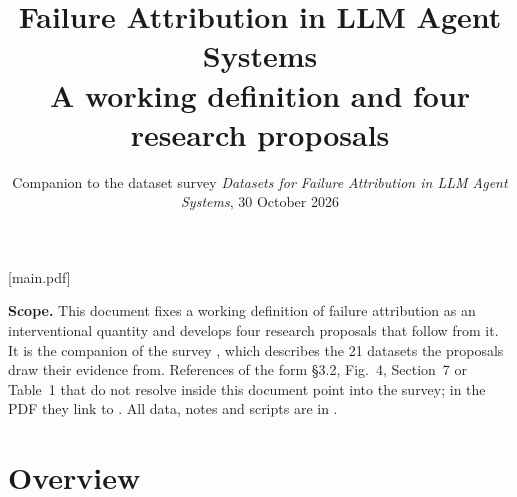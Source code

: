 \def\loadxrhyper{}          %

\usepackage[numbers,sort&compress]{natbib}
[main.pdf]   %
\title{\vspace{-9mm}\LARGE Failure Attribution in LLM Agent Systems\\[3pt]\large A working definition and four research proposals}
\author{\normalsize Companion to the dataset survey \emph{Datasets for Failure Attribution in LLM Agent Systems}, 30 October 2026}\date{}

\maketitle\vspace{-7mm}
\begin{tcolorbox}[enhanced,colback=surface,colframe=rule,boxrule=0.3pt,arc=1.5pt,left=5pt,right=5pt,top=3pt,bottom=3pt,fontupper=\small]
\textbf{Scope.} This document fixes a working definition of failure attribution as an interventional quantity and develops four research proposals that follow from it. It is the companion of the survey , which describes the 21 datasets the proposals draw their evidence from. References of the form \S3.2, Fig.~4, Section~7 or Table~1 that do not resolve inside this document point into the survey; in the PDF they link to . All data, notes and scripts are in .
\end{tcolorbox}
\vspace{-2pt}\tableofcontents

\section{Overview}\label{sec:future}

